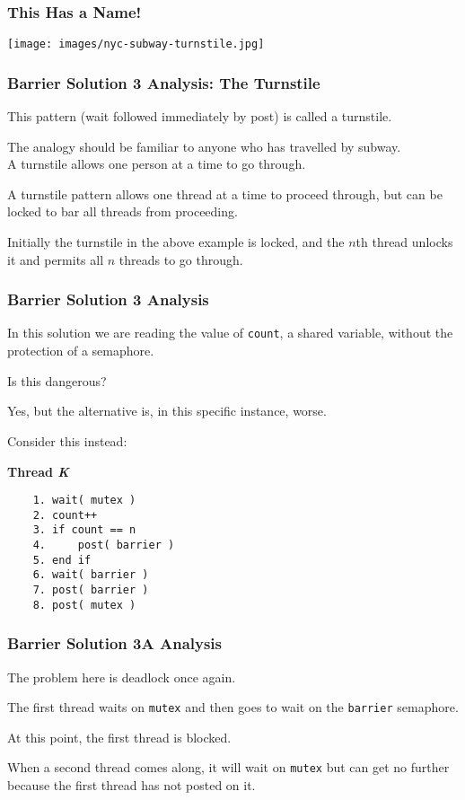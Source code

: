 \begin{frame}
	\frametitle{This Has a Name!}
	\begin{center}
		\texttt{[image: images/nyc-subway-turnstile.jpg]}
	\end{center}

\end{frame}


\begin{frame}
	\frametitle{Barrier Solution 3 Analysis: The Turnstile}

	This pattern (wait followed immediately by post) is called a \alert{turnstile}.

	The analogy should be familiar to anyone who has travelled by subway.\\
	\quad A turnstile allows one person at a time to go through.

	A turnstile pattern allows one thread at a time to proceed through, but can be locked to bar all threads from proceeding.

	Initially the turnstile in the above example is locked, and the $n$th thread unlocks it and permits all $n$ threads to go through.

\end{frame}

\begin{frame}[fragile]
	\frametitle{Barrier Solution 3 Analysis}

	In this solution we are reading the value of \texttt{count}, a shared variable, without the protection of a semaphore.

	Is this dangerous?

	Yes, but the alternative is, in this specific instance, worse.

	Consider this instead:

	\textbf{Thread \textit{K}}\vspace{-2em}
	\begin{verbatim}
	1. wait( mutex )
	2. count++
	3. if count == n
	4.     post( barrier )
	5. end if
	6. wait( barrier )
	7. post( barrier )
	8. post( mutex )
  	\end{verbatim}
	\vspace{-2em}

\end{frame}

\begin{frame}
	\frametitle{Barrier Solution 3A Analysis}

	The problem here is deadlock once again.

	The first thread waits on \texttt{mutex} and then goes to wait on the \texttt{barrier} semaphore.

	At this point, the first thread is blocked.

	When a second thread comes along, it will wait on \texttt{mutex} but can get no further because the first thread has not posted on it.


\end{frame}

